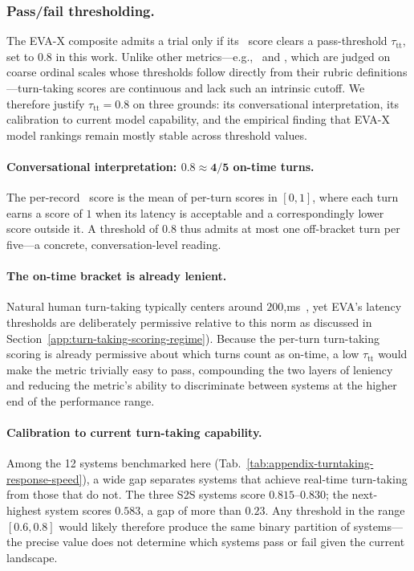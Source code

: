 \subsubsection*{Pass/fail thresholding.} 
\label{sec:turntaking-threshold}

The EVA-X composite admits a trial only if its \metricturntaking~score clears a
pass-threshold $\tau_{\text{tt}}$, set to $0.8$ in this work. Unlike other
metrics---e.g., \metricfaithfulness~and \metricconcise, which are judged on
coarse ordinal scales whose thresholds follow directly from their rubric
definitions---turn-taking scores are
continuous and lack such an intrinsic cutoff. We therefore justify
$\tau_{\text{tt}} = 0.8$ on three grounds: its conversational interpretation,
its calibration to current model capability, and the empirical finding that EVA-X model rankings remain mostly stable across threshold values.

\paragraph{Conversational interpretation: \(\boldsymbol{0.8 \approx 4/5}\) on-time turns.}
The per-record \metricturntaking~score is the mean of per-turn scores in $[0, 1]$, where each
turn earns a score of $1$ when its latency is acceptable and a
correspondingly lower score outside it. A threshold of $0.8$ thus admits at most one
off-bracket turn per five---a concrete, conversation-level reading.

\paragraph{The on-time bracket is already lenient.}
Natural human turn-taking typically centers around $200$,ms~\citep{stivers2009universals,heldner2010pauses}, yet EVA's latency thresholds are deliberately permissive relative to this norm as discussed in Section~\ref{app:turn-taking-scoring-regime}). Because the per-turn turn-taking scoring is already permissive about which turns count as
on-time, a low $\tau_{\text{tt}}$ would make the metric trivially easy to pass, compounding the two layers of leniency and reducing the metric's ability to discriminate between systems at the higher end of the performance range.

\paragraph{Calibration to current turn-taking capability.}
Among the 12 systems benchmarked here
(Tab.~\ref{tab:appendix-turntaking-response-speed}), a wide gap separates
systems that achieve real-time turn-taking from those that do not. The three
S2S systems score $0.815$--$0.830$; the next-highest system scores $0.583$, a
gap of more than $0.23$. Any threshold in the range $[0.6, 0.8]$ would likely
therefore produce the same binary partition of systems---the precise
value does not determine which systems pass or fail given the current
landscape.

